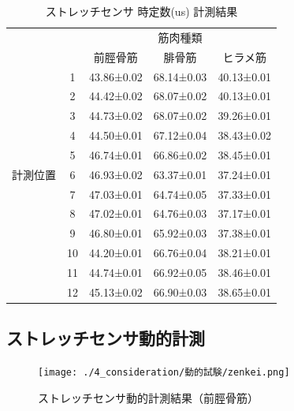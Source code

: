 \begin{table}[h]
    \caption{ストレッチセンサ 時定数(us) 計測結果}
    \label{4_2}
        \begin{center}
            \begin{tabular}{|c|c|ccc|}\hline
            \multicolumn{2}{|c|}{} & \multicolumn{3}{c|}{筋肉種類}\\
            \cline{3-5}
            \multicolumn{2}{|c|}{} & 前脛骨筋 & 腓骨筋 & ヒラメ筋 \\ \hline
            & 1 & 43.86±0.02 & 68.14±0.03 & 40.13±0.01 \\ \cline{2-5}
            & 2 & 44.42±0.02 & 68.07±0.02 & 40.13±0.01 \\ \cline{2-5}
            & 3 & 44.73±0.02 & 68.07±0.02 & 39.26±0.01 \\ \cline{2-5}
            & 4 & 44.50±0.01 & 67.12±0.04 & 38.43±0.02 \\ \cline{2-5}
            & 5 & 46.74±0.01 & 66.86±0.02 & 38.45±0.01 \\ \cline{2-5}
            計測位置 & 6 & 46.93±0.02 & 63.37±0.01 & 37.24±0.01 \\ \cline{2-5}
            & 7 & 47.03±0.01 & 64.74±0.05 & 37.33±0.01 \\ \cline{2-5}
            & 8 & 47.02±0.01 & 64.76±0.03 & 37.17±0.01 \\ \cline{2-5}
            & 9 & 46.80±0.01 & 65.92±0.03 & 37.38±0.01 \\ \cline{2-5}
            & 10 & 44.20±0.01 & 66.76±0.04 & 38.21±0.01 \\ \cline{2-5}
            & 11 & 44.74±0.01 & 66.92±0.05 & 38.46±0.01 \\ \cline{2-5}
            & 12 & 45.13±0.02 & 66.90±0.03 & 38.65±0.01 \\ \hline
        \end{tabular}
    \end{center}
\end{table}

\subsection{ストレッチセンサ動的計測}
\begin{figure}
  \texttt{[image: ./4\_consideration/動的試験/zenkei.png]}
  \caption{ストレッチセンサ動的計測結果（前脛骨筋）}
  \label{}
\end{figure}

